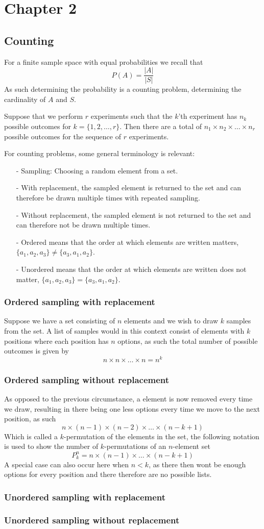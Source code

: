 \section{Chapter 2}
\subsection{Counting}
For a finite sample space with equal probabilities we recall that
\[
    P(A)=\frac{|A|}{|S|}
\]
As such determining the probability is a counting problem, determining the cardinality of $A$ and $S$.
\begin{definition}
    Suppose that we perform $r$ experiments such that the $k$'th experiment has $n_{k}$ possible outcomes for $k=\{1,2,\ldots,r\}$. Then there are a total of $n_{1}\times n_{2}\times\ldots\times n_{r}$ possible outcomes for the sequence of $r$ experiments.
\end{definition}
For counting problems, some general terminology is relevant:
\begin{itemize}
    \item[-] Sampling: Choosing a random element from a set.
    \item[-] With replacement, the sampled element is returned to the set and can therefore be drawn multiple times with repeated sampling.
    \item[-] Without replacement, the sampled element is not returned to the set and can therefore not be drawn multiple times.
    \item[-] Ordered means that the order at which elements are written matters, $\{a_{1},a_{2},a_{3}\}\neq \{a_{3},a_{1},a_{2}\}$.
    \item[-] Unordered means that the order at which elements are written does not matter, $\{a_{1},a_{2},a_{3}\}=\{a_{3},a_{1},a_{2}\}$.
\end{itemize}
\subsubsection{Ordered sampling with replacement}
Suppose we have a set consisting of $n$ elements and we wish to draw $k$ samples from the set. A list of samples would in this context consist of elements with $k$ positions where each position has $n$ options, as such the total number of possible outcomes is given by
\[
    n\times n\times\ldots\times n=n^{k}
\]
\subsubsection{Ordered sampling without replacement}
As opposed to the previous circumstance, a element is now removed every time we draw, resulting in there being one less options every time we move to the next position, as such
\[
    n\times (n-1)\times (n-2)\times\ldots\times (n-k+1)
\]
Which is called a $k$-permutation of the elements in the set, the following notation is used to show the number of $k$-permutations of an $n$-element set
\[
    P_{k}^{n}=n\times(n-1)\times\ldots\times(n-k+1)
\]
A special case can also occur here when $n<k$, as there then wont be enough options for every position and there therefore are no possible lists.
\subsubsection{Unordered sampling with replacement}
\subsubsection{Unordered sampling without replacement}
